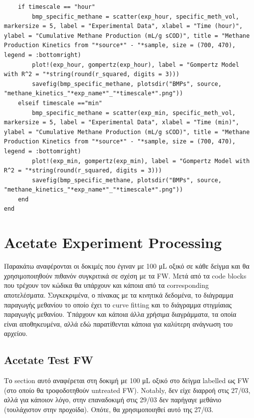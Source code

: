 \documentclass[11pt]{article}
\begin{document}
\begin{verbatim}
    if timescale == "hour"
        bmp_specific_methane = scatter(exp_hour, specific_meth_vol, markersize = 5, label = "Experimental Data", xlabel = "Time (hour)", ylabel = "Cumulative Methane Production (mL/g sCOD)", title = "Methane Production Kinetics from "*source*" - "*sample, size = (700, 470), legend = :bottomright)
        plot!(exp_hour, gompertz(exp_hour), label = "Gompertz Model with R^2 = "*string(round(r_squared, digits = 3)))
        savefig(bmp_specific_methane, plotsdir("BMPs", source, "methane_kinetics_"*exp_name*"_"*timescale*".png"))
    elseif timescale =="min" 
        bmp_specific_methane = scatter(exp_min, specific_meth_vol, markersize = 5, label = "Experimental Data", xlabel = "Time (min)", ylabel = "Cumulative Methane Production (mL/g sCOD)", title = "Methane Production Kinetics from "*source*" - "*sample, size = (700, 470), legend = :bottomright)
        plot!(exp_min, gompertz(exp_min), label = "Gompertz Model with R^2 = "*string(round(r_squared, digits = 3)))
        savefig(bmp_specific_methane, plotsdir("BMPs", source, "methane_kinetics_"*exp_name*"_"*timescale*".png"))
    end
end

\end{verbatim}

\section{Acetate Experiment Processing}
\label{sec:org8ebf262}
Παρακάτω αναφέρονται οι δοκιμές που έγιναν με 100 μL οξικό σε κάθε δείγμα και θα χρησιμοποιηθούν πιθανόν συγκριτικά σε σχέση με τα FW. Μετά από τα code blocks που τρέχουν τον κώδικα θα υπάρχουν και κάποια από τα corresponding αποτελέσματα. Συγκεκριμένα, ο πίνακας με τα κινητικά δεδομένα, το διάγραμμα παραγωγής μεθανίου το οποίο έχει το curve fitting και το διάγραμμα στιγμίαιας παραγωγής μεθανίου. Υπάρχουν και κάποια άλλα χρήσιμα διαγράμματα, τα οποία είναι αποθηκευμένα, αλλά εδώ παρατίθενται κάποια για καλύτερη ανάγνωση του αρχείου.

\subsection{Acetate Test FW}
\label{sec:org7289072}
Το section αυτό αναφέρεται στη δοκιμή με 100 μL οξικό στο δείγμα labelled ως FW (στο οποίο θα τροφοδοτηθούν untreated FW). Notably, δεν είχε διαρροή στις 27/03, αλλά για κάποιον λόγο, στην επαναδοκιμή στις 29/03 δεν παρήγαγε μεθάνιο (τουλάχιστον στην προχοίδα). Οπότε, θα χρησιμοποιηθεί αυτό της 27/03.
\end{document}
